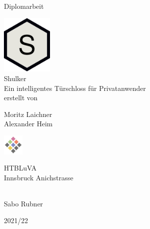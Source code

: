 \begin{titlepage}
	\begin{center}
		\Large{Diplomarbeit} \\
		
		\bigskip
		\bigskip
		\bigskip

		\includegraphics[width=2.5cm]{../images/logo.png} \\
		\Huge{Shulker} \\
		\bigskip
		\bigskip
		\bigskip
		\huge{Ein intelligentes Türschloss für Privatanwender} \\

		\bigskip
		\bigskip
		\bigskip
		\large{erstellt von} \\

		\bigskip
		\bigskip
		\bigskip
		
		\Huge{Moritz Laichner} \\
		\Huge{Alexander Heim} \\
		\bigskip
		\bigskip
		\bigskip

		
		\bigskip
	    \bigskip
        
        \includegraphics[width=1cm]{../images/htl-logo}

		\Large{HTBLuVA} \\
		\Large{Innsbruck Anichstrasse} \\

		\bigskip		
		\bigskip
		\bigskip

		 \\
		Sabo Rubner

		\bigskip
		\bigskip
		\bigskip
		\bigskip
		
		\Large{2021/22}

	\end{center}
 
\end{titlepage}